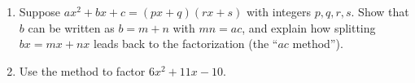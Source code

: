 \begin{enumerate}
\item[(a)] Suppose $ax^2+bx+c=(px+q)(rx+s)$ with integers $p,q,r,s$. Show that $b$ can be written as $b=m+n$ with $mn=ac$, and explain how splitting $bx=mx+nx$ leads back to the factorization (the ``$ac$ method'').
\item[(b)] Use the method to factor $6x^2+11x-10$.
\end{enumerate}
